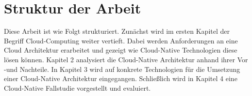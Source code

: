 \section{Struktur der Arbeit}
Diese Arbeit ist wie Folgt strukturiert. Zunächst wird im ersten Kapitel der Begriff Cloud-Computing weiter vertieft. Dabei werden Anforderungen an eine Cloud Architektur erarbeitet und gezeigt wie Cloud-Native Technologien diese lösen können. Kapitel 2 analysiert die Cloud-Native Architektur anhand ihrer Vor -und Nachteile. In Kapitel 3 wird auf konkrete Technologien für die Umsetzung einer Cloud-Native Architektur eingegangen. Schließlich wird in Kapitel 4 eine Cloud-Native Fallstudie vorgestellt und evaluiert.  


